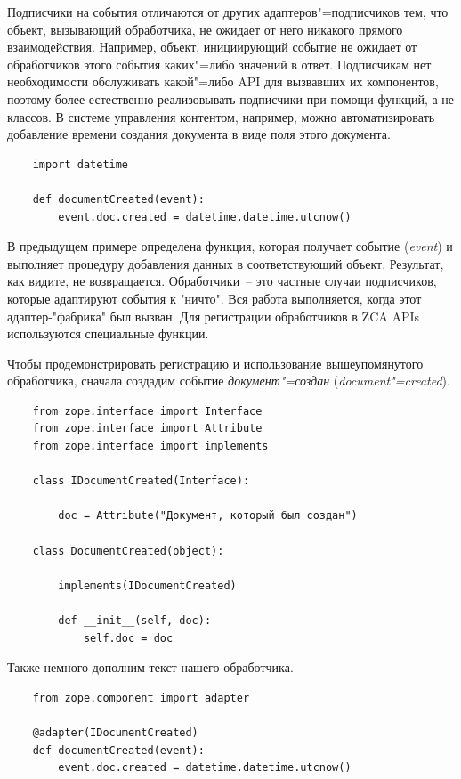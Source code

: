 \documentclass[a4paper,openany,twoside,final]{book}
\providecommand*{\DUroletitlereference}[1]{\textsl{#1}}
\begin{document}
Подписчики на события отличаются от других адаптеров"=подписчиков тем, что объект, вызывающий обработчика, не ожидает от него никакого прямого взаимодействия.  Например, объект, инициирующий событие не ожидает от обработчиков этого события каких"=либо значений в ответ.  Подписчикам нет необходимости обслуживать какой"=либо API для вызвавших их компонентов, поэтому более естественно реализовывать подписчики при помощи функций, а не классов.  В системе управления контентом, например, можно автоматизировать добавление времени создания документа в виде поля этого документа.

\begin{verbatim}
    import datetime

    def documentCreated(event):
        event.doc.created = datetime.datetime.utcnow()
\end{verbatim}

В предыдущем примере определена функция, которая получает событие (\DUroletitlereference{event}) и выполняет процедуру добавления данных в соответствующий объект.  Результат, как видите, не возвращается.  Обработчики~-- это частные случаи подписчиков, которые адаптируют события к "ничто".  Вся работа выполняется, когда этот адаптер-"фабрика" был вызван.  Для регистрации обработчиков в ZCA APIs используются специальные функции.

Чтобы продемонстрировать регистрацию и использование вышеупомянутого обработчика, сначала создадим событие \DUroletitlereference{документ"=создан} (\DUroletitlereference{document"=created}).

\begin{verbatim}
    from zope.interface import Interface
    from zope.interface import Attribute
    from zope.interface import implements

    class IDocumentCreated(Interface):

        doc = Attribute("Документ, который был создан")

    class DocumentCreated(object):

        implements(IDocumentCreated)

        def __init__(self, doc):
            self.doc = doc
\end{verbatim}

Также немного дополним текст нашего обработчика.

\begin{verbatim}
    from zope.component import adapter

    @adapter(IDocumentCreated)
    def documentCreated(event):
        event.doc.created = datetime.datetime.utcnow()
\end{verbatim}
\end{document}
